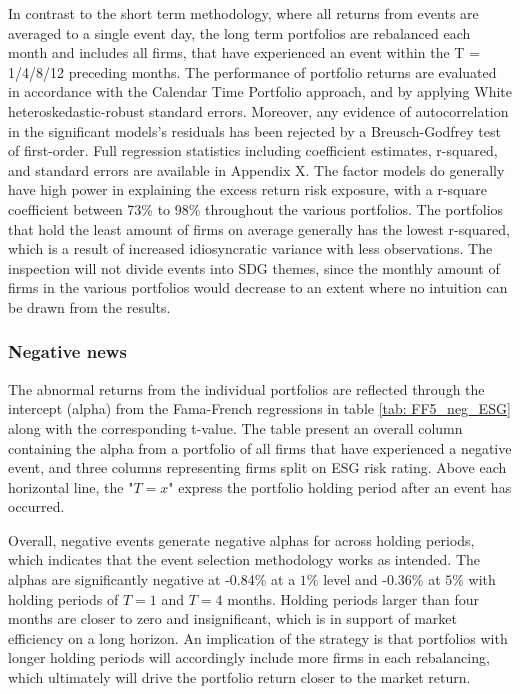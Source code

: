 In contrast to the short term methodology, where all returns from events are averaged to a single event day, the long term portfolios are rebalanced each month and includes all firms, that have experienced an event within the T = 1/4/8/12 preceding months. The performance of portfolio returns are evaluated in accordance with the Calendar Time Portfolio approach, and by applying White heteroskedastic-robust standard errors. Moreover, any evidence of autocorrelation in the significant models's residuals has been rejected by a Breusch-Godfrey test of first-order. Full regression statistics including coefficient estimates, r-squared, and standard errors are available in Appendix X. The factor models do generally have high power in explaining the excess return risk exposure, with a r-square coefficient between 73\% to 98\% throughout the various portfolios. The portfolios that hold the least amount of firms on average generally has the lowest r-squared, which is a result of increased idiosyncratic variance with less observations. The inspection will not divide events into SDG themes, since the monthly amount of firms in the various portfolios would decrease to an extent where no intuition can be drawn from the results.  

\subsubsection{Negative news}

The abnormal returns from the individual portfolios are reflected through the intercept (alpha) from the Fama-French regressions in table \ref{tab: FF5_neg_ESG} along with the corresponding t-value. The table present an overall column containing the alpha from a portfolio of all firms that have experienced a negative event, and three columns representing firms split on ESG risk rating. Above each horizontal line, the "$T = x$" express the portfolio holding period after an event has occurred. 

Overall, negative events generate negative alphas for across holding periods, which indicates that the event selection methodology works as intended. The alphas are  significantly negative at -0.84\% at a $1\%$ level and -0.36\% at $5\%$ with holding periods of $T = 1$ and $T = 4$ months. Holding periods larger than four months are closer to zero and insignificant, which is in support of market efficiency on a long horizon. An implication of the strategy is that portfolios with longer holding periods will accordingly include more firms in each rebalancing, which ultimately will drive the portfolio return closer to the market return.  

